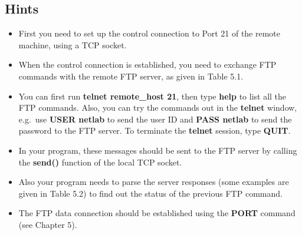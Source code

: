 \documentclass{../UTNetLab}
\begin{document}
    \subsection*{Hints}
    \begin{itemize}
        \item First you need to set up the control connection to Port 21 of the remote machine, using a TCP socket.
        \item When the control connection is established, you need to exchange FTP commands with the remote FTP server, as given in Table 5.1.
        \item You can first run \textbf{telnet remote\_host 21}, then type \textbf{help} to list all the FTP commands.
        Also, you can try the commands out in the \textbf{telnet} window, e.g.\  use \textbf{USER netlab} to send the user ID and \textbf{PASS netlab} to send the password to the FTP server.
        To terminate the \textbf{telnet} session, type \textbf{QUIT}.
        \item In your program, these messages should be sent to the FTP server by calling the \textbf{send()} function of the local TCP socket.
        \item Also your program needs to parse the server responses (some examples are given in Table 5.2) to find out the status of the previous FTP command.
        \item The FTP data connection should be established using the \textbf{PORT} command (see Chapter 5).
    \end{itemize}
\end{document}
